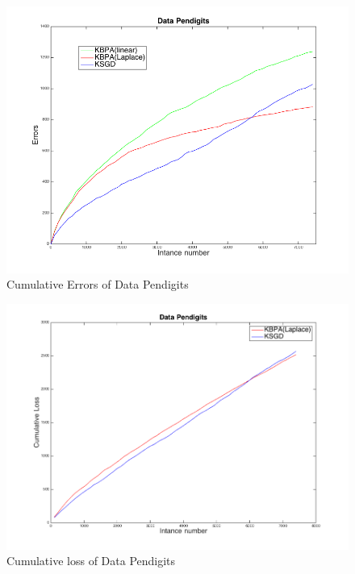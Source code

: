 \begin{figure}[h!]
\label{pic:PKCM}
\centerline{
\includegraphics[scale = 0.4]{fig05/mc/Pendigits_kernel_CM.png}}
\caption{Cumulative Errors of Data Pendigits}
\end{figure}

\begin{figure}[h!]
\label{pic:PKR}
\centerline{
\includegraphics[scale = 0.4]{fig05/mc/Pendigits_kernel_R.png}}
\caption{Cumulative loss of Data Pendigits}
\end{figure}

